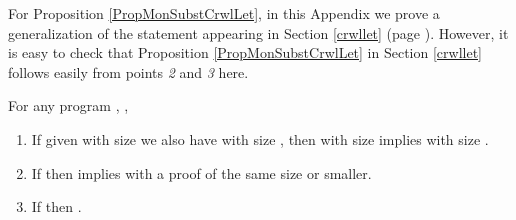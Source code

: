 For Proposition \ref{PropMonSubstCrwlLet}, in this Appendix we prove a generalization of the statement appearing in Section \ref{crwllet} (page \pageref{PropMonSubstCrwlLet}). However, it is easy to check that Proposition \ref{PropMonSubstCrwlLet} in Section \ref{crwllet} follows easily from points {\em 2} and {\em 3} here.

For any program , , 
\begin{enumerate}
    \item If  given  with size  we also have  with size , then  with size  implies  with size .
    \item If  then  implies  with a proof of the same size or smaller.
    \item If  then .
\end{enumerate}

